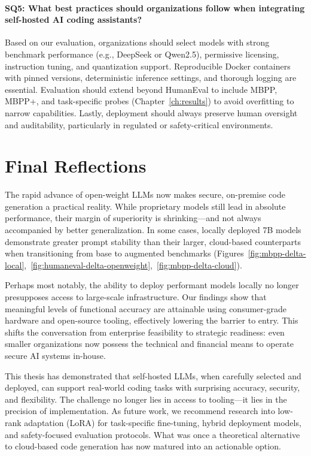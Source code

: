 \paragraph{SQ5: What best practices should organizations follow when integrating self-hosted AI coding assistants?}
Based on our evaluation, organizations should select models with strong benchmark performance (e.g., DeepSeek or Qwen2.5), permissive licensing, instruction tuning, and quantization support. Reproducible Docker containers with pinned versions, deterministic inference settings, and thorough logging are essential. Evaluation should extend beyond HumanEval to include MBPP, MBPP+, and task-specific probes (Chapter~\ref{ch:results}) to avoid overfitting to narrow capabilities. Lastly, deployment should always preserve human oversight and auditability, particularly in regulated or safety-critical environments.

\section{Final Reflections}

The rapid advance of open-weight LLMs now makes secure, on-premise code generation a practical reality. While proprietary models still lead in absolute performance, their margin of superiority is shrinking—and not always accompanied by better generalization. In some cases, locally deployed 7B models demonstrate greater prompt stability than their larger, cloud-based counterparts when transitioning from base to augmented benchmarks (Figures~\ref{fig:mbpp-delta-local},~\ref{fig:humaneval-delta-openweight},~\ref{fig:mbpp-delta-cloud}).

Perhaps most notably, the ability to deploy performant models locally no longer presupposes access to large-scale infrastructure. Our findings show that meaningful levels of functional accuracy are attainable using consumer-grade hardware and open-source tooling, effectively lowering the barrier to entry. This shifts the conversation from enterprise feasibility to strategic readiness: even smaller organizations now possess the technical and financial means to operate secure AI systems in-house.

This thesis has demonstrated that self-hosted LLMs, when carefully selected and deployed, can support real-world coding tasks with surprising accuracy, security, and flexibility. The challenge no longer lies in access to tooling—it lies in the precision of implementation. As future work, we recommend research into low-rank adaptation (LoRA) for task-specific fine-tuning, hybrid deployment models, and safety-focused evaluation protocols. What was once a theoretical alternative to cloud-based code generation has now matured into an actionable option.
